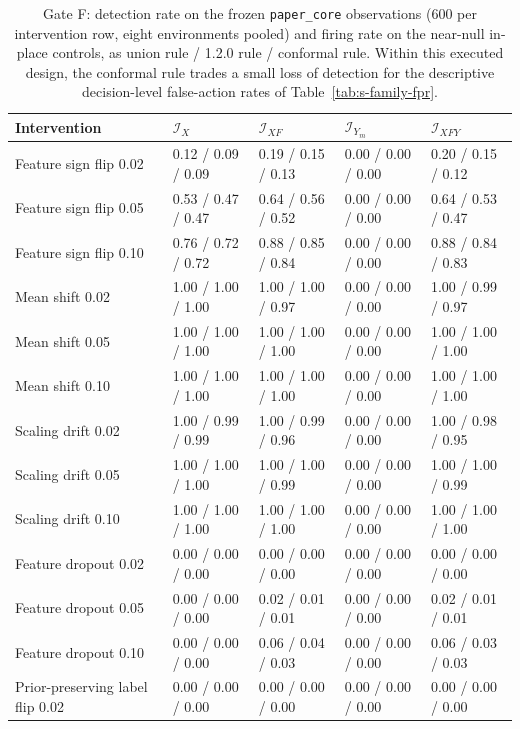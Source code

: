 \begin{table}[!tbp]
\caption{Gate F: detection rate on the frozen \texttt{paper\_core} observations (600 per intervention row, eight environments pooled) and firing rate on the near-null in-place controls, as union rule / 1.2.0 rule / conformal rule. Within this executed design, the conformal rule trades a small loss of detection for the descriptive decision-level false-action rates of Table~\ref{tab:s-family-fpr}.}
\label{tab:s-family-detection}
\centering
\scriptsize
\setlength{\tabcolsep}{3pt}
\begin{tabular}{@{}lllll@{}}
\toprule
Intervention & $\mathcal I_X$ & $\mathcal I_{XF}$ & $\mathcal I_{Y_m}$ & $\mathcal I_{XFY}$ \\
\midrule
Feature sign flip 0.02 & 0.12 / 0.09 / 0.09 & 0.19 / 0.15 / 0.13 & 0.00 / 0.00 / 0.00 & 0.20 / 0.15 / 0.12 \\
Feature sign flip 0.05 & 0.53 / 0.47 / 0.47 & 0.64 / 0.56 / 0.52 & 0.00 / 0.00 / 0.00 & 0.64 / 0.53 / 0.47 \\
Feature sign flip 0.10 & 0.76 / 0.72 / 0.72 & 0.88 / 0.85 / 0.84 & 0.00 / 0.00 / 0.00 & 0.88 / 0.84 / 0.83 \\
Mean shift 0.02 & 1.00 / 1.00 / 1.00 & 1.00 / 1.00 / 0.97 & 0.00 / 0.00 / 0.00 & 1.00 / 0.99 / 0.97 \\
Mean shift 0.05 & 1.00 / 1.00 / 1.00 & 1.00 / 1.00 / 1.00 & 0.00 / 0.00 / 0.00 & 1.00 / 1.00 / 1.00 \\
Mean shift 0.10 & 1.00 / 1.00 / 1.00 & 1.00 / 1.00 / 1.00 & 0.00 / 0.00 / 0.00 & 1.00 / 1.00 / 1.00 \\
Scaling drift 0.02 & 1.00 / 0.99 / 0.99 & 1.00 / 0.99 / 0.96 & 0.00 / 0.00 / 0.00 & 1.00 / 0.98 / 0.95 \\
Scaling drift 0.05 & 1.00 / 1.00 / 1.00 & 1.00 / 1.00 / 0.99 & 0.00 / 0.00 / 0.00 & 1.00 / 1.00 / 0.99 \\
Scaling drift 0.10 & 1.00 / 1.00 / 1.00 & 1.00 / 1.00 / 1.00 & 0.00 / 0.00 / 0.00 & 1.00 / 1.00 / 1.00 \\
Feature dropout 0.02 & 0.00 / 0.00 / 0.00 & 0.00 / 0.00 / 0.00 & 0.00 / 0.00 / 0.00 & 0.00 / 0.00 / 0.00 \\
Feature dropout 0.05 & 0.00 / 0.00 / 0.00 & 0.02 / 0.01 / 0.01 & 0.00 / 0.00 / 0.00 & 0.02 / 0.01 / 0.01 \\
Feature dropout 0.10 & 0.00 / 0.00 / 0.00 & 0.06 / 0.04 / 0.03 & 0.00 / 0.00 / 0.00 & 0.06 / 0.03 / 0.03 \\
Prior-preserving label flip 0.02 & 0.00 / 0.00 / 0.00 & 0.00 / 0.00 / 0.00 & 0.00 / 0.00 / 0.00 & 0.00 / 0.00 / 0.00 \\

\end{tabular}
\end{table}
